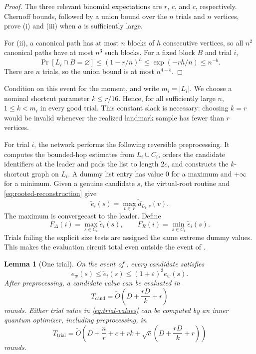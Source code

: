 \documentclass[11pt]{article}
\newtheorem{lemma}[theorem]{Lemma}
\theoremstyle{definition}
\newcommand{\eps}{\varepsilon}
\newcommand{\ecc}{e_w}
\newcommand{\wtO}{\widetilde O}
\begin{document}
\begin{proof}
The three relevant binomial expectations are $r$, $c$, and $c$,
respectively.  Chernoff bounds, followed by a union bound over the $n$ trials
and $n$ vertices, prove (i) and (iii) when $a$ is sufficiently large.

For (ii), a canonical path has at most $n$ blocks of $h$ consecutive
vertices, so all $n^2$ canonical paths have at most $n^3$ such blocks.  For a
fixed block $B$ and trial $i$,
\[
  \Pr[L_i\cap B=\varnothing]
  \leq (1-r/n)^h
  \leq \exp(-rh/n)
  \leq n^{-b}.
\]
There are $n$ trials, so the union bound is at most $n^{4-b}$.
\end{proof}

Condition on this event for the moment, and write $m_i=|L_i|$.  We choose a
nominal shortcut parameter $k\leq r/16$.  Hence, for all sufficiently large
$n$, $1\leq k<m_i$ in every good trial.  This constant slack is necessary:
choosing $k=r$ would be invalid whenever the realized landmark sample has
fewer than $r$ vertices.

For trial $i$, the network performs the following reversible preprocessing.
It computes the bounded-hop estimates from $L_i\cup C_i$, orders the candidate
identifiers at the leader and pads the list to length $2c$, and constructs the
$k$-shortcut graph on $L_i$.  A dummy list entry has value $0$ for a maximum
and $+\infty$ for a minimum.  Given a genuine candidate $s$, the virtual-root
routine and \eqref{eq:rooted-reconstruction} give
\[
  \widetilde e_i(s)=\max_{v\in V}\widetilde d_{L_i,s}(v).
\]
The maximum is convergecast to the leader.  Define
\[
  F_\Delta(i)=\max_{s\in C_i}\widetilde e_i(s),
  \qquad
  F_R(i)=\min_{s\in C_i}\widetilde e_i(s).
  \tag{10}\label{eq:trial-values}
\]
Trials failing the explicit size tests are assigned the same extreme dummy
values.  This makes the evaluation circuit total even outside the event of
.

\begin{lemma}[One trial]
\label{lem:one-trial}
On the event of , every candidate satisfies
\[
  \ecc(s)\leq\widetilde e_i(s)
  \leq(1+\eps)^2\ecc(s).
  \tag{11}\label{eq:eccentricity-guarantee}
\]
After preprocessing, a candidate value can be evaluated in
\[
  T_{\mathrm{cand}}
  =\wtO\!\left(D+\frac{rD}{k}+r\right)
  \tag{12}\label{eq:candidate-cost}
\]
rounds.  Either trial value in \eqref{eq:trial-values} can be computed by an
inner quantum optimizer, including preprocessing, in
\[
  T_{\mathrm{trial}}
  =\wtO\!\left(
    D+\frac nr+c+rk
    +\sqrt c\left(D+\frac{rD}{k}+r\right)
  \right)
  \tag{13}\label{eq:trial-cost}
\]
rounds.
\end{lemma}
\end{document}
